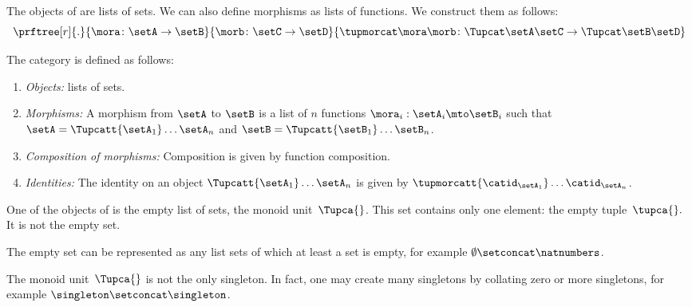 The objects of \SetStar are lists of sets.
We can also define morphisms as lists of functions.
We construct them as follows:
%
\begin{equation}
    \label{eq:sets-monoid-maps2}
    \prftree[r]{.}{ 
        \mora \colon \setA \to \setB
    }{ 
        \morb \colon \setC \to \setD
    }{ 
        \tupmorcat \mora \morb \colon \Tupcat \setA   \setC \to \Tupcat \setB  \setD
    }
\end{equation}
%
\begin{definition}
    The category \SetStar is defined as follows: 
    \begin{enumerate}
        \item \emph{Objects:} lists of sets.
        \item \emph{Morphisms:} A morphism from $\setA$ to $\setB$ is a list of $n$ functions $\mora_i: \setA_i \mto \setB_i$ such that $\setA = \Tupcatt {\setA_1}  \dots {\setA_n}$ and  $\setB = \Tupcatt {\setB_1} \dots {\setB_n}$.
        \item \emph{Composition of morphisms:} Composition is given by function composition.
        \item \emph{Identities:} The identity on an object $\Tupcatt {\setA_1} \dots {\setA_n}$ is given by $\tupmorcatt {\catid_{\setA_1}} \dots  {\catid_{\setA_n}} $.
    \end{enumerate}
\end{definition}


One of the objects of \SetStar is the empty list of sets, the monoid unit~$\Tupca{ }$.
This set contains only one element: the empty tuple~$\tupca{ }.$
It is not the empty set.

The empty set can be represented as any list sets of which at least a set is empty, for example 
$\emptyset \setconcat \natnumbers$.

The monoid unit~$\Tupca{ }$ is not the only singleton. 
In fact, one may create many singletons by collating zero or more singletons, for example $
    \singleton \setconcat \singleton 
$.




%

\showslides{
    \begin{forslides}
        
        \begin{equation}
            \tupca \ela   = \ela
        \end{equation}
        ~
        \begin{equation}
            \label{eq:sets-monoid-el-cat}
            \tupcat \ela \elb \elconcat \elc = \tupcatt \ela \elb \elc
        \end{equation}
    \end{forslides}
}
